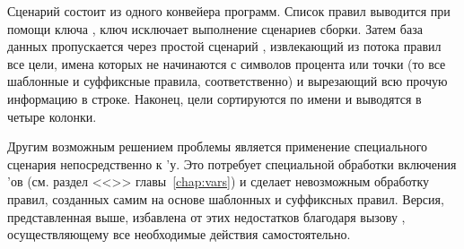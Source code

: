 Сценарий состоит из одного конвейера программ. Список правил \GNUmake{}
выводится при помощи ключа , ключ
 исключает выполнение сценариев сборки. Затем
база данных пропускается через простой сценарий ,
извлекающий из потока правил все цели, имена которых не начинаются
с символов процента или точки (то все шаблонные и суффиксные правила,
соответственно) и вырезающий всю прочую информацию в строке. Наконец,
цели сортируются по имени и выводятся в четыре колонки.

Другим возможным решением проблемы является применение специального
сценария  непосредственно к \Makefile{}'у. Это потребует
специальной обработки включения \Makefile{}'ов (см. раздел
<<>> главы~\ref{chap:vars}) и сделает
невозможным обработку правил, созданных самим \GNUmake{} на основе
шаблонных и суффиксных правил. Версия, представленная выше, избавлена
от этих недостатков благодаря вызову \GNUmake{}, осуществляющему все
необходимые действия самостоятельно.
